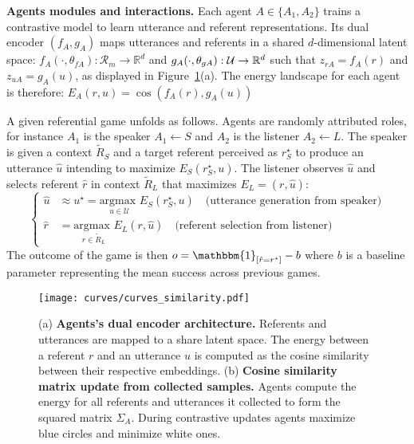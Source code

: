 \textbf{Agents modules and interactions. } Each agent $A\in\{A_1,A_2\}$ trains a contrastive model to learn utterance and referent representations. Its dual encoder $(f_A,g_A)$ maps utterances and referents in a shared $d$-dimensional latent space: $f_A(\cdot,\theta_{fA}): \mathcal{R}_m \rightarrow \mathbb{R}^d$ and $g_A(\cdot,\theta_{gA}): \mathcal{U} \rightarrow  \mathbb{R}^d$ such that $z_{rA}=f_A(r)$ and $z_{uA}=g_A(u)$, as displayed in Figure~\ref{fig:curves_encoders}(a). The energy landscape for each agent is therefore: $E_A(r,u) = \cos(f_A(r),g_A(u))$

A given referential game unfolds as follows. Agents are randomly attributed roles, for instance $A_1$ is the speaker $A_1\leftarrow S$ and $A_2$ is the listener $A_2 \leftarrow L$. The speaker is given a context $\tilde{R}_S$ and a target referent perceived as $r^\star_S$ to produce an utterance $\hat{u}$ intending to maximize $E_S(r^\star_S,u)$. The listener observes $\hat{u}$ and selects referent $\hat{r}$ in context $\tilde{R}_L$ that maximizes $E_L=(r,\hat{u})$:
\begin{equation}
\left\{
\begin{split}
    \hat{u} &\approx u^\star= \underset{u \in \mathcal{U}}{\textrm{argmax }} E_S(r^\star_S,u) \quad \text{(utterance generation from speaker)}\\
    \hat{r} &= \underset{r \in \tilde{R}_L}{\textrm{argmax }} E_L(r,\hat{u}) \quad \text{(referent selection from listener)}
\end{split}
\right.
\label{eq:ut_gen_ref_sel}
\end{equation}
The outcome of the game is then $o = \mathbbm{1}_{[\hat{r}=r^\star]} - b$ where $b$ is a baseline parameter representing the mean success across previous games.  

\begin{figure}[h!]
\centering 
\texttt{[image: curves/curves\_similarity.pdf]}
\caption{(a) \textbf{Agents's dual encoder architecture.} Referents and utterances are mapped to a share latent space. The energy between a referent $r$ and an utterance $u$ is computed as the cosine similarity between their respective embeddings. (b) \textbf{Cosine similarity matrix update from collected samples.} Agents compute the energy for all referents and utterances it collected to form the squared matrix $\Sigma_A$. During contrastive updates agents maximize blue circles and minimize white ones.}
\label{fig:curves_encoders}
\end{figure}

